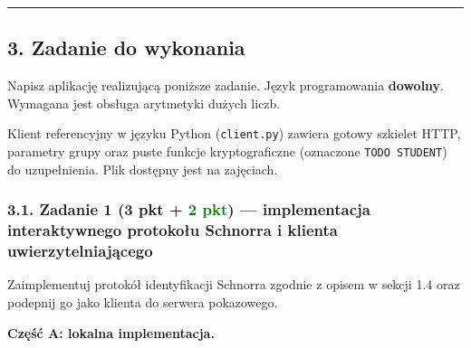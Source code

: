 \documentclass[
]{article}
\let\oldrule\rule
\renewcommand{\rule}[2]{\noindent\oldrule{\linewidth}{0.4pt}}
\begin{document}
\begin{center}\rule{0.5\linewidth}{0.5pt}\end{center}

\subsection{3. Zadanie do wykonania}\label{zadanie-do-wykonania}

Napisz aplikację realizującą poniższe zadanie. Język programowania
\textbf{dowolny}. Wymagana jest obsługa arytmetyki dużych liczb.

Klient referencyjny w języku Python (\texttt{client.py}) zawiera gotowy
szkielet HTTP, parametry grupy oraz puste funkcje kryptograficzne
(oznaczone \texttt{TODO\ STUDENT}) do uzupełnienia. Plik dostępny jest
na zajęciach.

\subsubsection{\texorpdfstring{3.1. Zadanie 1 (3 pkt +
\textcolor{green}{2 pkt}) --- implementacja interaktywnego protokołu
Schnorra i klienta
uwierzytelniającego}{3.1. Zadanie 1 (3 pkt + ) --- implementacja interaktywnego protokołu Schnorra i klienta uwierzytelniającego}}\label{zadanie-1-3-pkt-implementacja-interaktywnego-protokoux142u-schnorra-i-klienta-uwierzytelniajux105cego}

Zaimplementuj protokół identyfikacji Schnorra zgodnie z opisem w sekcji
1.4 oraz podepnij go jako klienta do serwera pokazowego.

\textbf{Część A: lokalna implementacja.}
\end{document}
